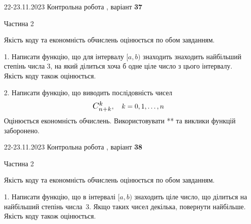\documentclass[12pt, ukrainian]{article}
\begin{document}
{{{{{{{{%
\begin {Huge}
{{22-23.11.2023 Контрольна робота , варіант  \No \textbf { 37 }\par}}

\begin{center}Частина 2
\end{center}
\vspace{10mm}
\end {Huge}

{
\begin {Large}
Якість коду та економність обчислень оцінюється по обом завданням.

\vspace{5mm}

1. Написати функцію, що для інтервалу $[a, b)$ знаходить знаходить найбільший степінь числа 3, на який ділиться хоча б одне ціле число з цього інтервалу.\\	Якість коду також оцінюється. 



\vspace{10mm}



2. 
Написати функцію, що виводить послідовність чисел
$$\scalebox{1.2}{$C_{n+k}^{k}$}, \quad k=0,1,\ldots,n$$
Оцінюється економність обчислень. Використовувати ** та виклики функцій заборонено.

\end{Large}\newpage




\begin {Huge}
{{22-23.11.2023 Контрольна робота , варіант  \No \textbf { 38 }\par}}

\begin{center}Частина 2
\end{center}
\vspace{10mm}
\end {Huge}

{
\begin {Large}
Якість коду та економність обчислень оцінюється по обом завданням.

\vspace{5mm}

1. Написати функцію, що в інтервалі $[a, b)$ знаходить ціле число, що ділиться на найбільший степінь числа 3. Якщо таких чисел декілька, повернути найбільше.\\	Якість коду також оцінюється. 




\end{Large}}}}}}}}}}}
\end{document}

